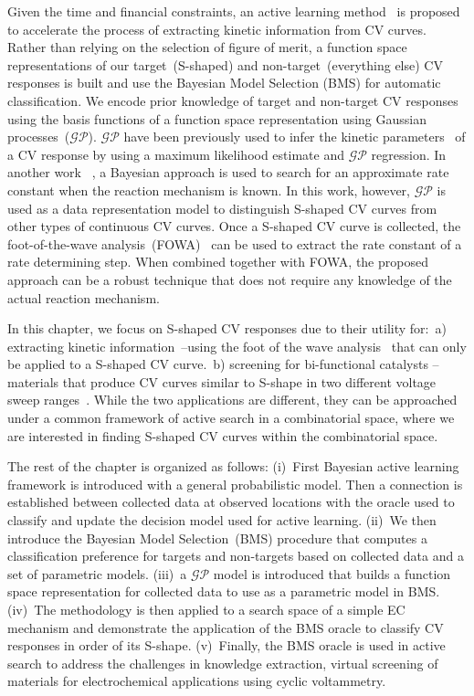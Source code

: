 Given the time and financial constraints, an active learning method~\cite{jiang2018efficient,RGActiveIntro, GardnerALIntro} is proposed to accelerate the process of extracting kinetic information from CV curves. 
Rather than relying on the selection of figure of merit, a function space representations of our target~(S-shaped) and non-target~(everything else) CV responses is built and use the Bayesian Model Selection (BMS) for automatic classification. 
We encode prior knowledge of target and non-target CV responses using the basis functions of a function space representation using Gaussian processes~(\(\mathcal{GP}\)).
\(\mathcal{GP}\) have been previously used to infer the kinetic parameters~\cite{gavaghan2018use,robinson2018separating} of a CV response by using a maximum likelihood estimate and \(\mathcal{GP}\) regression. 
In another work ~\cite{li2019application}, a Bayesian approach is used to search for an approximate rate constant when the reaction mechanism is known. 
In this work, however, \(\mathcal{GP}\) is used as a data representation model to distinguish S-shaped CV curves from other types of continuous CV curves. 
Once a S-shaped CV curve is collected, the foot-of-the-wave analysis~(FOWA)~\cite{FOWA} can be used to extract the rate constant of a rate determining step. 
When combined together with FOWA, the proposed approach can be a robust technique that does not require any knowledge of the actual reaction mechanism.

In this chapter, we focus on S-shaped CV responses due to their utility for:~a) extracting kinetic information~\cite{costentin2015cyclic, rountree2014evaluation}--using the foot of the wave analysis~\cite{FOWA} that can only be applied to a S-shaped CV curve.~b) screening for bi-functional catalysts -- materials that produce CV curves similar to S-shape in two different voltage sweep ranges~\cite{bradley2019reversible, jung2016optimizing}. While the two applications are different, they can be approached under a common framework of active search in a combinatorial space, where we are interested in finding S-shaped CV curves within the combinatorial space. 


The rest of the chapter is organized as follows: (i)~First  Bayesian active learning framework is introduced with a general probabilistic model. Then a connection is established between collected data at observed locations with the oracle used to classify and update the decision model used for active learning. (ii)~We then introduce the Bayesian Model Selection~(BMS) procedure that computes a classification preference for targets and non-targets based on collected data and a set of parametric models. (iii)~a \(\mathcal{GP}\) model is introduced that builds a function space representation for collected data to use as a parametric model in BMS.  (iv)~The methodology is then applied to a search space of a simple EC mechanism and demonstrate the application of the BMS oracle to classify CV responses in order of its S-shape. (v)~Finally, the BMS oracle is used in active search to address the challenges in knowledge extraction, virtual screening of materials for electrochemical applications using cyclic voltammetry.